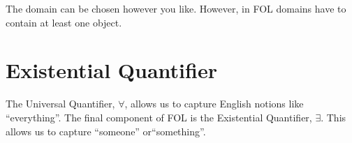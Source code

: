 The domain can be chosen however you like. However, in FOL domains have to contain at least one object.

%
%
%
%
%
%



\section{Existential Quantifier}
The Universal Quantifier, $\forall$, allows us to capture English notions like ``everything''. The final component of FOL is the Existential Quantifier, $\exists$. This allows us to capture ``someone'' or``something''.

